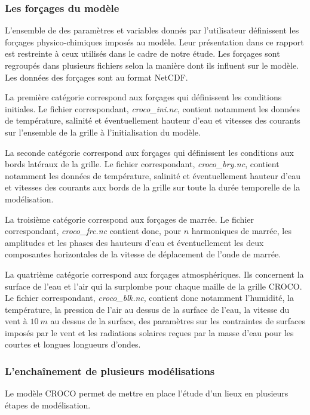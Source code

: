 \documentclass[10pt,a4paper,titlepage]{article}
\begin{document}
\subsubsection{Les forçages du modèle}
\label{subsub:forcages}
L'ensemble de des paramètres et variables donnés par l'utilisateur définissent les forçages physico-chimiques imposés au modèle.
Leur présentation dans ce rapport est restreinte à ceux utilisés dans le cadre de notre étude.
Les forçages sont regroupés dans plusieurs fichiers selon la manière dont ils influent sur le modèle.
Les données des forçages sont au format NetCDF.

La première catégorie correspond aux forçages qui définissent les conditions initiales.
Le fichier correspondant, \textit{croco\_ini.nc}, contient notamment les données de température, salinité et éventuellement hauteur d'eau et vitesses des courants sur l'ensemble de la grille à l'initialisation du modèle.

La seconde catégorie correspond aux forçages qui définissent les conditions aux bords latéraux de la grille.
Le fichier correspondant, \textit{croco\_bry.nc}, contient notamment les données de température, salinité et éventuellement hauteur d'eau et vitesses des courants aux bords de la grille sur toute la durée temporelle de la modélisation.

La troisième catégorie correspond aux forçages de marrée.
Le fichier correspondant, \textit{croco\_frc.nc} contient donc, pour $n$ harmoniques de marrée, les amplitudes et les phases des hauteurs d'eau et éventuellement les deux composantes horizontales de la vitesse de déplacement de l'onde de marrée.

La quatrième catégorie correspond aux forçages atmosphériques.
Ils concernent la surface de l'eau et l'air qui la surplombe pour chaque maille de la grille CROCO.
Le fichier correspondant, \textit{croco\_blk.nc}, contient donc notamment l'humidité, la température, la pression de l'air au dessus de la surface de l'eau, la vitesse du vent à $10~m$ au dessus de la surface, des paramètres sur les contraintes de surfaces imposés par le vent et les radiations solaires reçues par la masse d'eau pour les courtes et longues longueurs d'ondes.

\subsubsection{L'enchaînement de plusieurs modélisations}
\label{subsub:enchainement_modelisations}
Le modèle CROCO permet de mettre en place l'étude d'un lieux en plusieurs étapes de modélisation.
\end{document}
